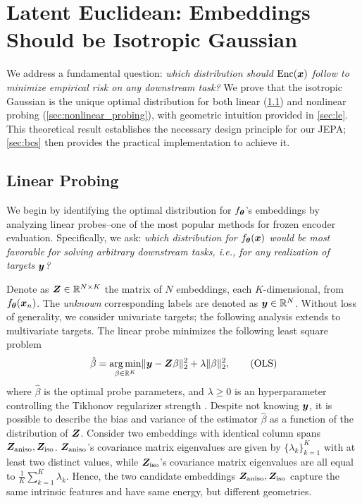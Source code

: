 \section{Latent Euclidean: Embeddings Should be Isotropic Gaussian}
\label{sec:gaussian}


We address a fundamental question: {\em which distribution should ${\rm Enc}({\bm{x}})$ 
follow to minimize empirical risk on any downstream task?} We prove that the 
isotropic Gaussian is the unique optimal distribution for both linear 
(\cref{sec:linear_probing}) and nonlinear probing (\cref{sec:nonlinear_probing}), 
with geometric intuition provided in \cref{sec:le}. This theoretical result 
establishes the necessary design principle for our JEPA; \cref{sec:bcs} 
then provides the practical implementation to achieve it.


\subsection{Linear Probing}
\label{sec:linear_probing}


We begin by identifying the optimal distribution for $f_{\bm{\theta}}$'s embeddings 
by analyzing linear probes--one of the most popular methods for frozen 
encoder evaluation. Specifically, we ask: \emph{which distribution for 
$f_{\bm{\theta}}({\bm{x}})$ would be most favorable for solving arbitrary downstream tasks, 
i.e., for any realization of targets ${\bm{y}}$?}


Denote as ${\bm{Z}} \in \mathbb{R}^{N \times K}$ the matrix of $N$ embeddings, each $K$-dimensional, from $f_{{\bm{\theta}}}({\bm{x}}_n)$. The {\em unknown} corresponding labels are denoted as ${\bm{y}} \in \mathbb{R}^{N}$. Without loss of generality, we consider univariate targets; the 
following analysis extends to multivariate targets. The linear probe minimizes the following least square problem \citep{bishop2006pattern}
\begin{equation}
\hat{\beta} = \underset{\beta \in \mathbb{R}^K}{\arg\min} \|{\bm{y}} - {\bm{Z}}\beta\|_2^2+\lambda \|\beta\|_2^2,\tag{OLS}\label{eq:OLS}
\end{equation}
where $\hat{\beta}$ is the optimal probe parameters, and $\lambda \geq 0$ is an hyperparameter controlling the Tikhonov regularizer strength \citep{bishop1995training,golub1999tikhonov}. Despite not knowing ${\bm{y}}$, it is possible to describe the bias and variance of the estimator $\hat{\beta}$ as a function of the distribution of ${\bm{Z}}$. Consider two embeddings with identical column spans ${\bm{Z}}_{\rm aniso}, {\bm{Z}}_{\rm iso}$. ${\bm{Z}}_{\rm aniso}$'s covariance matrix eigenvalues are given by $\{\lambda_k\}_{k=1}^K$ with at least two distinct values, while ${\bm{Z}}_{\rm iso}$'s covariance matrix eigenvalues are all equal to $\frac{1}{K}\sum_{k=1}^{K}\lambda_k$. Hence, the two candidate embeddings ${\bm{Z}}_{\rm aniso}, {\bm{Z}}_{\rm iso}$ capture the same intrinsic features and have same energy, but different geometries.



